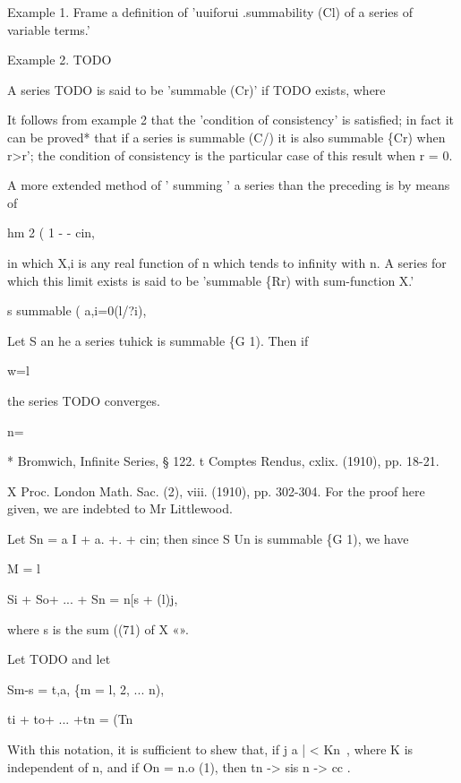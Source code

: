 Example 1. Frame a definition of 'uuiforui .summability (Cl) of a
series of variable terms.'

Example 2. TODO


A series TODO is said to be 'summable (Cr)' if TODO exists, where

It follows from example 2 that the 'condition of consistency'
is satisfied; in fact it can be proved* that if a series is summable
(C/) it is also summable \{Cr) when r>r'; the condition of consistency
is the particular case of this result when r = 0.


A more extended method of ' summing ' a series than the preceding is
by means of

hm 2 ( 1 - - cin,

in which X,i is any real function of n which tends to infinity with n.
A series for which this limit exists is said to be 'summable \{Rr)
with sum-function X.'


s summable ( a,i=0(l/?i),

Let S an he a series tuhick is summable \{G 1). Then if

w=l

the series TODO converges.

n=\

* Bromwich, Infinite Series, § 122. t Comptes Rendus, cxlix. (1910),
pp. 18-21.

X Proc. London Math. Sac. (2), viii. (1910), pp. 302-304. For the
proof here given, we are indebted to Mr Littlewood.

Let Sn = a I + a. +. + cin; then since S Un is summable \{G 1), we
have

% 
% 

M = l

Si + So+ ... + Sn = n[s + (l)j,

where s is the sum ((71) of X «».

Let TODO and let

Sm-s = t,a, \{m = l, 2, ... n),

ti + to+ ... +tn = (Tn 

With this notation, it is sufficient to shew that, if j a | < Kn~,
where K is independent of n, and if On = n.o (1), then tn -> sis n ->
cc .

